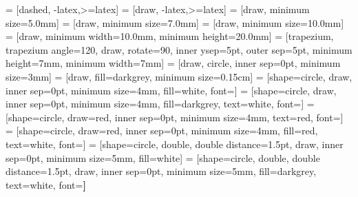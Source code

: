 \usetikzlibrary{calc, arrows, fit, positioning, patterns, decorations.pathreplacing, shapes}
 = [dashed, -latex,>=latex]
 = [draw, -latex,>=latex]
 = [draw, minimum size=5.0mm]
 = [draw, minimum size=7.0mm]
 = [draw, minimum size=10.0mm]
 = [draw, minimum width=10.0mm, minimum height=20.0mm]
 = [trapezium, trapezium angle=120, draw, rotate=90,  inner ysep=5pt, outer sep=5pt,
minimum height=7mm, minimum width=7mm]
 = [draw, circle, inner sep=0pt, minimum size=3mm]
 = [draw, fill=darkgrey, minimum size=0.15cm]
 = [shape=circle, draw, inner sep=0pt, minimum size=4mm, fill=white, font=\scriptsize]
 = [shape=circle, draw, inner sep=0pt, minimum size=4mm, fill=darkgrey, text=white, font=\scriptsize]
 = [shape=circle, draw=red, inner sep=0pt, minimum size=4mm, text=red, font=\scriptsize]
 = [shape=circle, draw=red, inner sep=0pt, minimum size=4mm, fill=red, text=white, font=\scriptsize]
 = [shape=circle, double, double distance=1.5pt, draw, inner sep=0pt, minimum size=5mm, fill=white]
 = [shape=circle, double, double distance=1.5pt, draw, inner sep=0pt, minimum size=5mm, fill=darkgrey, text=white, font=\bfseries]

\newcommand{\brackets}[4]{
      \draw[dotted, rounded corners=0.3cm, line width = 1pt] ($({#1},{#3})+(-0.3,0)$) -- ($({#1},{#3})+(-0.3,0.3)$) -- ($({#2},{#3})+(0.3,0.3)$) -- ($({#2},{#3})+(0.3,0)$);
      \draw[dotted, rounded corners=0.3cm, line width = 1pt] ($({#1},{#4})+(-0.3,0)$) -- ($({#1},{#4})+(-0.3,-0.3)$) -- ($({#2},{#4})+(0.3,-0.3)$) -- ($({#2},{#4})+(0.3,0)$);}

